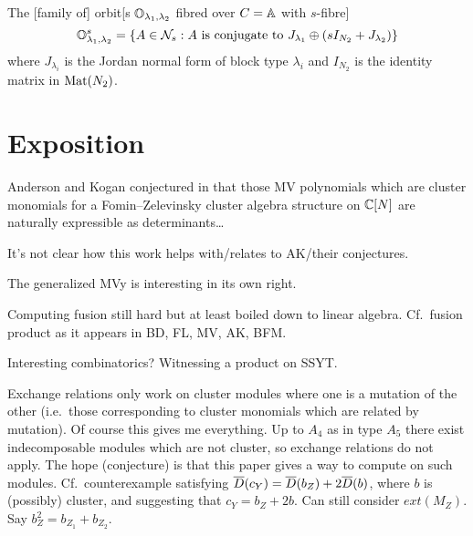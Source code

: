\documentclass[draft]{article}
\begin{document}

The [family of] orbit[s $\OO_{\lambda_1,\lambda_2}$ fibred over $C = \AA$ with $s$-fibre]  
\begin{equation}
    \OO_{\lambda_1,\lambda_2}^s = \{A \in \cN_s : A \text{ is conjugate to } J_{\lambda_1}\oplus (sI_{N_2} + J_{\lambda_2})\}
\end{equation}
where $J_{\lambda_i}$ is the Jordan normal form of block type $\lambda_i$ and $I_{N_2}$ is the identity matrix in $\mat(N_2)$.
% 
\section{Exposition}

Anderson and Kogan conjectured in \cite{anderson2006algebra}  that those MV polynomials which are cluster monomials for a Fomin--Zelevinsky cluster algebra structure on $\CC[N]$ are naturally expressible as determinants\dots

It's not clear how this work helps with/relates to AK/their conjectures.

The generalized MVy is interesting in its own right. 

Computing fusion still hard but at least boiled down to linear algebra. Cf.\ fusion product as it appears in BD, FL, MV, AK, BFM.

Interesting combinatorics? Witnessing a product on SSYT.

Exchange relations only work on cluster modules where one is a mutation of the other (i.e.\ those corresponding to cluster monomials which are related by mutation). Of course this gives me everything. Up to $A_4$ as in type $A_5$ there exist indecomposable modules which are not cluster, so exchange relations do not apply. The hope (conjecture) is that this paper gives a way to compute on such modules. Cf.\ counterexample satisfying $\barD(c_Y) = \barD(b_Z) + 2\barD(b)$, where $b$ is (possibly) cluster, and suggesting that $c_Y = b_Z + 2b$. Can still consider $ext(M_Z)$. Say $b_Z^2 = b_{Z_1} + b_{Z_2}$. 
\end{document}
